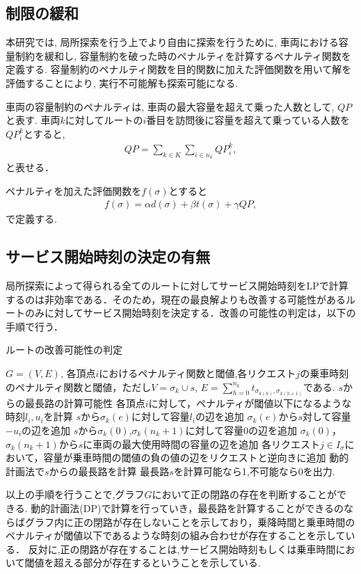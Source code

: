 \documentclass[a4j,11pt,twocolumn]{jsarticle}
\begin{document}
\subsection{{\large 制限の緩和}}
本研究では, 局所探索を行う上でより自由に探索を行うために, 車両における容量制約を緩和し, 容量制約を破った時のペナルティを計算するペナルティ関数を定義する. 容量制約のペナルティ関数を目的関数に加えた評価関数を用いて解を評価することにより, 実行不可能解も探索可能になる.

車両の容量制約のペナルティは, 車両の最大容量を超えて乗った人数として, $QP$と表す. 車両$k$に対してルートの$i$番目を訪問後に容量を超えて乗っている人数を$QP_i^k$とすると,
\begin{align*}
  QP = \sum_{k \in K}\sum_{i \in n_k} QP_i^k,
\end{align*}
と表せる．

ペナルティを加えた評価関数を$f(\sigma)$とすると
\begin{align*}
  f(\sigma) = \alpha d(\sigma)+ \beta t(\sigma) + \gamma QP,
\end{align*}
で定義する.

\subsection{{\large サービス開始時刻の決定の有無}}
局所探索によって得られる全てのルートに対してサービス開始時刻をLPで計算するのは非効率である．そのため，現在の最良解よりも改善する可能性があるルートのみに対してサービス開始時刻を決定する．改善の可能性の判定は，以下の手順で行う．

\begin{algorithm}
 \caption{ルートの改善可能性の判定}
 \label{algo1}
 \begin{algorithmic}[1]%
  \REQUIRE $G = (V, E)$, 各頂点$i$におけるペナルティ関数と閾値,各リクエスト$j$の乗車時刻のペナルティ関数と閾値，ただし$V=\sigma_k \cup s$, $E=\sum_{h=0}^{n_k} t_ {\sigma_{k(h)},\sigma_ {k(h+1)} }$である.
  \ENSURE  $s$からの最長路の計算可能性
  \STATE 各頂点$i$に対して，ペナルティが閾値以下になるような時刻$l_i,u_i$を計算
  \STATE $s$から$\sigma_k(e)$に対して容量$l_i$の辺を追加
  \STATE $\sigma_k(e)$から$s$対して容量$-u_i$の辺を追加
  \ENDFOR
  \STATE $s$から$\sigma_k(0)$,$\sigma_k(n_k+1)$に対して容量0の辺を追加
  \STATE $\sigma_k(0)$，$\sigma_k(n_k+1)からs$に車両の最大使用時間の容量の辺を追加
  \STATE 各リクエスト$j \in I_\sigma$において，容量が乗車時間の閾値の負の値の辺をリクエストと逆向きに追加
  \STATE 動的計画法で$s$からの最長路を計算
  \STATE 最長路$s$を計算可能なら1,不可能なら0を出力.
 \end{algorithmic}
\end{algorithm}
以上の手順を行うことで,グラフ$G$において正の閉路の存在を判断することができる.
動的計画法(DP)で計算を行っていき，最長路を計算することができるのならばグラフ内に正の閉路が存在しないことを示しており，乗降時間と乗車時間のペナルティが閾値以下であるような時刻の組み合わせが存在することを示している．
反対に,正の閉路が存在することは,サービス開始時刻もしくは乗車時間において閾値を超える部分が存在するということを示している.
\end{document}
